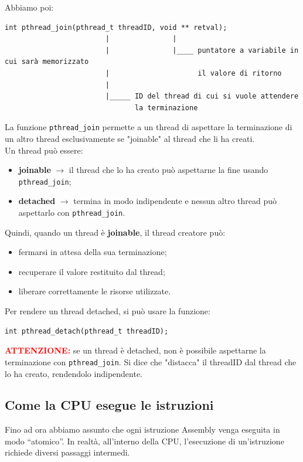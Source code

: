 \noindent Abbiamo poi:
\begin{verbatim}
int pthread_join(pthread_t threadID, void ** retval);
                        |               |
                        |               |____ puntatore a variabile in cui sarà memorizzato 
                        |                     il valore di ritorno
                        |
                        |_____ ID del thread di cui si vuole attendere
                               la terminazione
\end{verbatim}
La funzione \texttt{pthread\_join} permette a un thread di aspettare la terminazione di un altro thread esclusivamente se "joinable" al thread che li ha creati.\\
\noindent Un thread può essere:
\begin{itemize}
    \item \textbf{joinable} $\rightarrow$ il thread che lo ha creato può aspettarne la fine usando \texttt{pthread\_join};
    \item \textbf{detached} $\rightarrow$ termina in modo indipendente e nessun altro thread può aspettarlo con \texttt{pthread\_join}.
\end{itemize}
\noindent Quindi, quando un thread è \textbf{joinable}, il thread creatore può:
\begin{itemize}
    \item fermarsi in attesa della sua terminazione;
    \item recuperare il valore restituito dal thread;
    \item liberare correttamente le risorse utilizzate.
\end{itemize}
\noindent Per rendere un thread detached, si può usare la funzione:
\begin{verbatim}
int pthread_detach(pthread_t threadID);
\end{verbatim}
\textbf{\textcolor{red}{ATTENZIONE:}} se un thread è detached, non è possibile aspettarne la terminazione con \texttt{pthread\_join}. Si dice
che "distacca" il threadID dal thread che lo ha creato, rendendolo indipendente.
\noindent 
\subsection{Come la CPU esegue le istruzioni}

Fino ad ora abbiamo assunto che ogni istruzione Assembly venga eseguita in modo ``atomico''.
In realtà, all'interno della CPU, l'esecuzione di un'istruzione richiede diversi passaggi intermedi.


